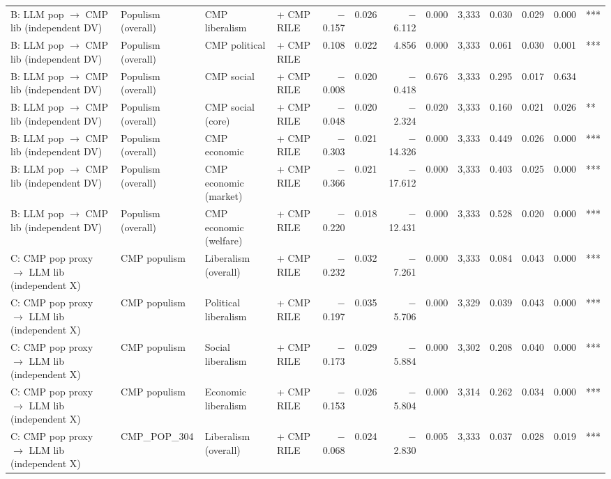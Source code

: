 \begin{table}[ht]
{\begin{tabular}{llllrrrrrrrrl}
B: LLM pop $\rightarrow$ CMP lib (independent DV) & Populism (overall) & CMP liberalism & + CMP RILE & $-$0.157 & 0.026 & $-$6.112 & 0.000 & 3,333 & 0.030 & 0.029 & 0.000 & *** \\
B: LLM pop $\rightarrow$ CMP lib (independent DV) & Populism (overall) & CMP political & + CMP RILE & 0.108 & 0.022 & 4.856 & 0.000 & 3,333 & 0.061 & 0.030 & 0.001 & *** \\
B: LLM pop $\rightarrow$ CMP lib (independent DV) & Populism (overall) & CMP social & + CMP RILE & $-$0.008 & 0.020 & $-$0.418 & 0.676 & 3,333 & 0.295 & 0.017 & 0.634 &  \\
B: LLM pop $\rightarrow$ CMP lib (independent DV) & Populism (overall) & CMP social (core) & + CMP RILE & $-$0.048 & 0.020 & $-$2.324 & 0.020 & 3,333 & 0.160 & 0.021 & 0.026 & ** \\
B: LLM pop $\rightarrow$ CMP lib (independent DV) & Populism (overall) & CMP economic & + CMP RILE & $-$0.303 & 0.021 & $-$14.326 & 0.000 & 3,333 & 0.449 & 0.026 & 0.000 & *** \\
B: LLM pop $\rightarrow$ CMP lib (independent DV) & Populism (overall) & CMP economic (market) & + CMP RILE & $-$0.366 & 0.021 & $-$17.612 & 0.000 & 3,333 & 0.403 & 0.025 & 0.000 & *** \\
B: LLM pop $\rightarrow$ CMP lib (independent DV) & Populism (overall) & CMP economic (welfare) & + CMP RILE & $-$0.220 & 0.018 & $-$12.431 & 0.000 & 3,333 & 0.528 & 0.020 & 0.000 & *** \\
C: CMP pop proxy $\rightarrow$ LLM lib (independent X) & CMP populism & Liberalism (overall) & + CMP RILE & $-$0.232 & 0.032 & $-$7.261 & 0.000 & 3,333 & 0.084 & 0.043 & 0.000 & *** \\
C: CMP pop proxy $\rightarrow$ LLM lib (independent X) & CMP populism & Political liberalism & + CMP RILE & $-$0.197 & 0.035 & $-$5.706 & 0.000 & 3,329 & 0.039 & 0.043 & 0.000 & *** \\
C: CMP pop proxy $\rightarrow$ LLM lib (independent X) & CMP populism & Social liberalism & + CMP RILE & $-$0.173 & 0.029 & $-$5.884 & 0.000 & 3,302 & 0.208 & 0.040 & 0.000 & *** \\
C: CMP pop proxy $\rightarrow$ LLM lib (independent X) & CMP populism & Economic liberalism & + CMP RILE & $-$0.153 & 0.026 & $-$5.804 & 0.000 & 3,314 & 0.262 & 0.034 & 0.000 & *** \\
C: CMP pop proxy $\rightarrow$ LLM lib (independent X) & CMP\_POP\_304 & Liberalism (overall) & + CMP RILE & $-$0.068 & 0.024 & $-$2.830 & 0.005 & 3,333 & 0.037 & 0.028 & 0.019 & *** \\

\end{tabular}}
\end{table}
